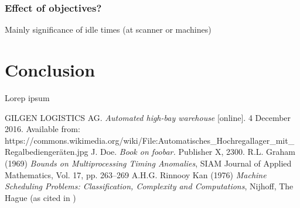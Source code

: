 \documentclass{ctuthesis}
\begin{document}
\subsection{Effect of objectives?}
Mainly significance of idle times (at scanner or machines)
\chapter{Conclusion}

Lorep ipsum \cite{doe}

\begin{thebibliography}{1}
 GILGEN LOGISTICS AG. \emph{Automated high-bay warehouse} [online]. 4 December 2016. Available from: https://commons.wikimedia.org/wiki/File:Automatisches\_Hochregallager\_mit\_Regalbediengeräten.jpg
 J. Doe. \emph{Book on foobar.} Publisher X,
 2300.
  R.L. Graham (1969) \emph{Bounds on Multiprocessing Timing Anomalies}, SIAM
Journal of Applied Mathematics, Vol. 17, pp. 263–269
 A.H.G. Rinnooy Kan (1976) \emph{Machine Scheduling Problems: Classification,
Complexity and Computations}, Nijhoff, The Hague (as cited in \cite{pinedo})


\end{thebibliography}
\end{document}
